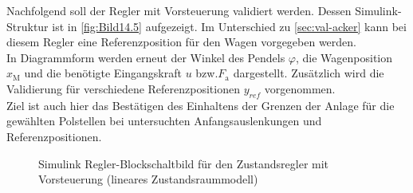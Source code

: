 \documentclass[
	pagesize,
	fontsize=12pt,
	paper=a4,
	oneside,
   reqno
]{scrartcl}
\newcommand{\bzw}{bzw.\xspace}
\begin{document}
Nachfolgend soll der Regler mit Vorsteuerung validiert werden. Dessen Simulink-Struktur ist in \autoref{fig:Bild14.5} aufgezeigt. Im Unterschied zu \autoref{sec:val-acker} kann bei diesem Regler eine Referenzposition für den Wagen vorgegeben werden. \\
In Diagrammform werden erneut der Winkel des Pendels $\varphi$, die Wagenposition $x_{\mathrm{M}}$ und die benötigte Eingangskraft $u$ \bzw $F_{\mathrm{a}}$ dargestellt. Zusätzlich wird die Validierung für verschiedene Referenzpositionen $y_{ref}$ vorgenommen. \\
Ziel ist auch hier das Bestätigen des Einhaltens der Grenzen der Anlage für die gewählten Polstellen bei untersuchten Anfangsauslenkungen und Referenzpositionen. 

\begin{figure}[H]
    \centering
    \caption[Regler mit Vorsteuerung Simulink (linear)]{Simulink Regler-Blockschaltbild für den Zustandsregler mit Vorsteuerung (lineares Zustandsraummodell)}
    \label{fig:Bild14.5}
\end{figure}
\end{document}
